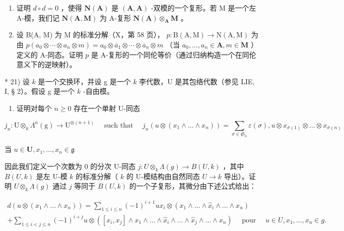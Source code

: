 \begin{enumerate}
\def\labelenumi{\alph{enumi})}
\setcounter{enumi}{1}
\item
  证明 \(d \circ d = 0\) ，使得 \(\mathbf{N}(\mathbf{A})\) 是 \((\mathbf{A}, \mathbf{A})\) -双模的一个复形。若 M 是一个左 A-模，我们记 \(\mathbf{N}(\mathbf{A}, \mathbf{M})\) 为 A-复形 \(\mathbf{N}(\mathbf{A}) \otimes_{\mathbf{A}} \mathbf{M}\) 。
\item
  设 B(A, M) 为 M 的标准分解（X，第 58 页）， \(p: \mathrm{B}(\mathrm{A}, \mathrm{M}) \to \mathrm{N}(\mathrm{A}, \mathrm{M})\) 为由 \(p(a_0 \otimes \cdots \otimes a_n \otimes m) = a_0 \otimes \overline{a}_1 \otimes \cdots \otimes \overline{a}_n \otimes m\) （当 \(a_0, \ldots, a_n \in \mathbf{A}, m \in \mathbf{M}\) ）定义的 A-同态。证明 \(p\) 是 A-复形的一个同伦等价（通过归纳构造一个在同伦意义下的逆映射）。
\end{enumerate}

* 21) 设 \(k\) 是一个交换环，并设 g 是一个 \(k\) 李代数，U 是其包络代数（参见 LIE, I, § 2）。假设 g 是一个 \(k\) -自由模。

\begin{enumerate}
\def\labelenumi{\alph{enumi})}
\tightlist
\item
  证明对每个 \(n \geqslant 0\) 存在一个单射 U-同态
\end{enumerate}

\[
j _ {n}: \mathrm{U} \otimes_ {k} \Lambda^ {n} (\mathrm{g}) \rightarrow \mathrm{U} ^ {\otimes (n + 1)} \quad \text { such that } \quad j _ {n} (u \otimes (x _ {1} \wedge \dots \wedge x _ {n})) = \sum_ {\sigma \in \mathfrak {S} _ {n}} \varepsilon (\sigma), u \otimes x _ {\sigma (1)} \otimes \dots \otimes x _ {\sigma (n)}
\]

当 \(u\in \mathbf{U},x_1,\dots ,x_n\in \mathfrak{g}\)

因此我们定义一个次数为 0 的分次 U-同态 \(j:U\otimes_{k}\Lambda(g)\to B(U,k)\) ，其中 \(B(U,k)\) 是左 U-模 \(k\) 的标准分解（ \(k\) 的 U-模结构由自然同态 \(U\to k\) 导出）。证明 \(U\otimes_{k}\Lambda(g)\) 通过 \(j\) 等同于 \(B(U,k)\) 的一个子复形，其微分由下述公式给出：

\[
\begin{array}{l} d (u \otimes (x _ {1} \wedge \dots \wedge x _ {n})) = \sum_ {1 \leqslant i \leqslant n} (- 1) ^ {i + 1} u x _ {i} \otimes (x _ {1} \wedge \dots \wedge \hat {x} _ {i} \wedge \dots \wedge x _ {n}) \\ + \sum_ {1 \leqslant i <   j \leqslant n} (- 1) ^ {i + j} u \otimes ([ x _ {i}, x _ {j} ] \wedge x _ {1} \wedge \dots \wedge \hat {x} _ {i} \wedge \dots \wedge \hat {x} _ {j} \wedge \dots \wedge x _ {n}) \quad \text { pour } \quad u \in U, x _ {1},..., x _ {n} \in g. \end{array}
\]

